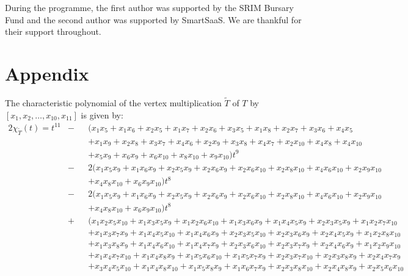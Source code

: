 \documentclass[12pt]{article}
\begin{document}
During the programme, the first author was supported by the SRIM Bursary Fund and the second author was supported by SmartSaaS. We are thankful for their support throughout. 

{}

\section*{Appendix}
The characteristic polynomial of the vertex multiplication $\tilde{T}$ of $T$ by $[x_1, x_2, \dots, {x}_{10}, x_{11}]$ is given by:
{\small \begin{alignat*}{2} 
\chi_{\tilde{T}}(t) = t^{11} & - && (x_{1}x_{5}+x_{1}x_{6}+x_{2}x_{5}+x_{1}x_{7}+x_{2}x_{6}+x_{3}x_{5}+x_{1}x_{8}+x_{2}x_{7}+x_{3}x_{6}+x_{4}x_{5} \\
& && +x_{1}x_{9}+x_{2}x_{8}+x_{3}x_{7}+x_{4}x_{6}+x_{2}x_{9}+x_{3}x_{8}+x_{4}x_{7}+x_{2}x_{10}+x_{4}x_{8}+x_{4}x_{10}\\ 
& && +x_{5}x_{9}+x_{6}x_{9}+x_{6}x_{10}+x_{8}x_{10}+x_{9}x_{10}) t^9 \\
&-&&2(x_{1}x_{5}x_{9}+x_{1}x_{6}x_{9}+x_{2}x_{5}x_{9}+x_{2}x_{6}x_{9}+x_{2}x_{6}x_{10}+x_{2}x_{8}x_{10}+x_{4}x_{6}x_{10} +x_{2}x_{9}x_{10} \\
& && +x_{4}x_{8}x_{10}+x_{6}x_{9}x_{10}) t^8 \\
&-&& 2(x_{1}x_{5}x_{9}+x_{1}x_{6}x_{9}+x_{2}x_{5}x_{9}+x_{2}x_{6}x_{9}+x_{2}x_{6}x_{10}+x_{2}x_{8}x_{10}+x_{4}x_{6}x_{10}+x_{2}x_{9}x_{10} \\
& && +x_{4}x_{8}x_{10}+x_{6}x_{9}x_{10}) t^8 \\ 
& + && (x_{1}x_{2}x_{5}x_{10}+x_{1}x_{3}x_{5}x_{9}+x_{1}x_{2}x_{6}x_{10}+x_{1}x_{3}x_{6}x_{9}+x_{1}x_{4}x_{5}x_{9}+x_{2}x_{3}x_{5}x_{9}+x_{1}x_{2}x_{7}x_{10} \\
& && +x_{1}x_{3}x_{7}x_{9}+x_{1}x_{4}x_{5}x_{10}+x_{1}x_{4}x_{6}x_{9}+x_{2}x_{3}x_{5}x_{10}+x_{2}x_{3}x_{6}x_{9}+x_{2}x_{4}x_{5}x_{9}+x_{1}x_{2}x_{8}x_{10}\\ 
& && +x_{1}x_{3}x_{8}x_{9}+x_{1}x_{4}x_{6}x_{10}+x_{1}x_{4}x_{7}x_{9}+x_{2}x_{3}x_{6}x_{10}+x_{2}x_{3}x_{7}x_{9}+x_{2}x_{4}x_{6}x_{9}+x_{1}x_{2}x_{9}x_{10}\\
& && +x_{1}x_{4}x_{7}x_{10}+x_{1}x_{4}x_{8}x_{9}+x_{1}x_{5}x_{6}x_{10}+x_{1}x_{5}x_{7}x_{9}+x_{2}x_{3}x_{7}x_{10}+x_{2}x_{3}x_{8}x_{9}+x_{2}x_{4}x_{7}x_{9}\\
& && +x_{3}x_{4}x_{5}x_{10}+x_{1}x_{4}x_{8}x_{10}+x_{1}x_{5}x_{8}x_{9}+x_{1}x_{6}x_{7}x_{9}+x_{2}x_{3}x_{8}x_{10}+x_{2}x_{4}x_{8}x_{9}+x_{2}x_{5}x_{6}x_{10} \\

\end{alignat*}}
\end{document}
